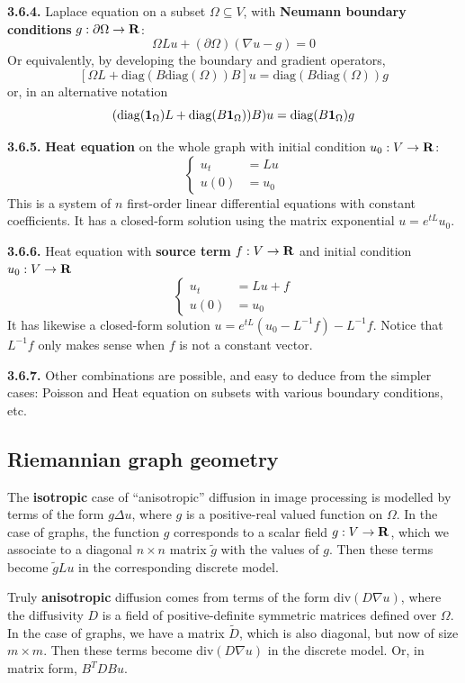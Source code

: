 {\bf 3.6.4.}
Laplace equation on a subset $\Omega\subseteq V$,
with {\bf Neumann boundary conditions}
$g:\partial\Omega\to\mathbf{R}$:
\[
\Omega Lu + (\partial\Omega)(\nabla u - g)=0
\]
Or equivalently, by developing the boundary and gradient operators,
\[
\left[\Omega L + \mathrm{diag}(B\mathrm{diag}(\Omega))B\right]u =\mathrm{diag}(B\mathrm{diag}(\Omega)) g
\]
or, in an alternative notation
\[
(\mathrm{diag}(\mathbf{1}_\Omega) L + \mathrm{diag}(B\mathbf{1}_\Omega))B)u
=\mathrm{diag}(B\mathbf{1}_\Omega) g
\]



{\bf 3.6.5.}
{\bf Heat equation} on the whole graph with initial condition $u_0:V\to\mathbf{R}$:
\[
\begin{cases}
u_t & =Lu \\
u(0) & = u_0 
\end{cases}
\]
This is a system of $n$ first-order linear differential equations with
constant coefficients.  It has a closed-form solution using the matrix
exponential $u=e^{tL}u_0$.



{\bf 3.6.6.}
Heat equation with {\bf source term} $f:V\to\mathbf{R}$ and initial condition
$u_0:V\to\mathbf{R}$
\[
\begin{cases}
u_t & =Lu+f \\
u(0) & = u_0
\end{cases}
\]
It has likewise a closed-form solution $u=e^{tL}(u_0-L^{-1}f)-L^{-1}f$.
Notice that $L^{-1}f$ only makes sense when $f$ is not a constant vector.



{\bf 3.6.7.}
Other combinations are possible, and easy to deduce from the simpler cases:
Poisson and Heat equation on subsets with various boundary conditions, etc.



\subsection{Riemannian graph geometry}


The {\bf isotropic} case of ``anisotropic'' diffusion in image processing is
modelled by terms of the form $g\Delta u$, where $g$ is a positive-real valued
function on $\Omega$.  In the case of graphs, the function $g$ corresponds to
a scalar field $g:V\to\mathbf{R}$, which we associate to a diagonal $n\times n$
matrix $\tilde g$ with the values of $g$.  Then these terms become $\tilde gL
u$ in the corresponding discrete model.



Truly {\bf anisotropic} diffusion comes from terms of the form
$\mathrm{div}(D\nabla u)$, where the diffusivity $D$ is a field of
positive-definite symmetric matrices defined over $\Omega$.  In the case of
graphs, we have a matrix $\tilde D$, which is also diagonal, but now of
size $m\times m$.  Then these terms become $\mathrm{div}(D\nabla u)$ in the
discrete model.  Or, in matrix form, $B^TDBu$.


